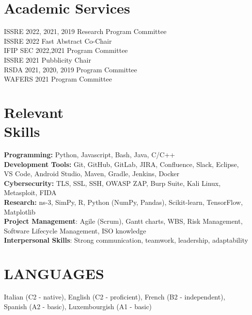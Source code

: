 \documentclass[margin,line]{resume}
\begin{document}
\begin{resume}
\section{\mysidestyle Academic Services}
ISSRE 2022, 2021, 2019 Research Program Committee
\vspace{1mm}\\%
ISSRE 2022 Fast Abstract Co-Chair
\vspace{1mm}\\%
IFIP SEC 2022,2021 Program Committee
\vspace{1mm}\\%
ISSRE 2021	Pubblicity Chair
\vspace{1mm}\\%
RSDA 2021, 2020, 2019 Program Committee
\vspace{1mm}\\%
WAFERS 2021 Program Committee

\filbreak
\section{\mysidestyle Relevant\\Skills} 
\textbf{Programming:} Python, Javascript, Bash, Java, C/C++\vspace{2mm}\\
\textbf{Development Tools:} Git, GitHub, GitLab, JIRA, Confluence, Slack, Eclipse, VS Code, Android Studio, Maven, Gradle, Jenkins, Docker \vspace{2mm}\\
\textbf{Cybersecurity:} TLS, SSL, SSH, OWASP ZAP, Burp Suite, Kali Linux, Metasploit, FIDA  \vspace{2mm}\\
\textbf{Research:} ns-3, SimPy, R, Python (NumPy, Pandas), Scikit-learn, TensorFlow, Matplotlib  \vspace{2mm}\\
\textbf{Project Management}: Agile (Scrum), Gantt charts, WBS, Risk Management, Software Lifecycle Management, ISO knowledge \vspace{2mm}\\
\textbf{Interpersonal Skills}: Strong communication, teamwork, leadership, adaptability \vspace{2mm}\\

\filbreak
\section{\mysidestyle LANGUAGES} 
Italian (C2 - native), English (C2 - proficient), French (B2 - independent), Spanish (A2 - basic), Luxembourgish (A1 - basic)


\end{resume}
\end{document}
